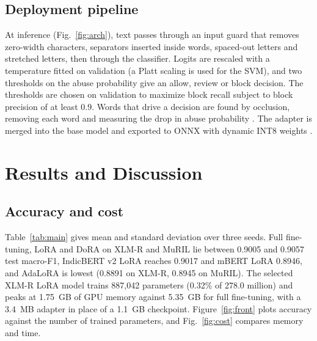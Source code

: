 \documentclass{svproc}
\begin{document}
\subsection{Deployment pipeline}
At inference (Fig.~\ref{fig:arch}), text passes through an input guard that removes zero-width characters, separators inserted inside words, spaced-out letters and stretched letters, then through the classifier. Logits are rescaled with a temperature fitted on validation \cite{guo2017calibration} (a Platt scaling \cite{platt1999} is used for the SVM), and two thresholds on the abuse probability give an allow, review or block decision. The thresholds are chosen on validation to maximize block recall subject to block precision of at least 0.9. Words that drive a decision are found by occlusion, removing each word and measuring the drop in abuse probability \cite{zeiler2014}. The adapter is merged into the base model and exported to ONNX with dynamic INT8 weights \cite{jacob2018}.

\section{Results and Discussion}
\label{sec:results}
\subsection{Accuracy and cost}
Table~\ref{tab:main} gives mean and standard deviation over three seeds. Full fine-tuning, LoRA and DoRA on XLM-R and MuRIL lie between 0.9005 and 0.9057 test macro-F1, IndicBERT v2 LoRA reaches 0.9017 and mBERT LoRA 0.8946, and AdaLoRA is lowest (0.8891 on XLM-R, 0.8945 on MuRIL). The selected XLM-R LoRA model trains 887,042 parameters (0.32\% of 278.0 million) and peaks at 1.75~GB of GPU memory against 5.35~GB for full fine-tuning, with a 3.4~MB adapter in place of a 1.1~GB checkpoint. Figure~\ref{fig:front} plots accuracy against the number of trained parameters, and Fig.~\ref{fig:cost} compares memory and time.
\end{document}
